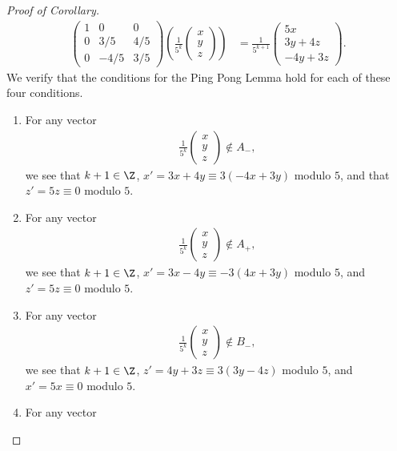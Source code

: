 \documentclass[10pt]{mypackage}
\begin{document}
\begin{proof}[Proof of Corollary]
\begin{align*}
    \begin{pmatrix}1 & 0 & 0 \\ 0 & 3/5 & 4/5 \\ 0 & -4/5 & 3/5\end{pmatrix} \left(\frac{1}{5^{k}} \begin{pmatrix}x\\y\\z\end{pmatrix}\right) &= \frac{1}{5^{k+1}} \begin{pmatrix}5x \\ 3y + 4z \\ -4y + 3z\end{pmatrix}.\tag*{(4)}
  \end{align*}
  We verify that the conditions for the Ping Pong Lemma hold for each of these four conditions.
  \begin{enumerate}[(1)]
    \item For any vector
      \begin{align*}
        \frac{1}{5^{k}} \begin{pmatrix}x\\y\\z\end{pmatrix} \notin A_{-},
      \end{align*}
      we see that $k+1\in \Z$, $x' = 3x + 4y \equiv 3\left(-4x + 3y\right)$  modulo $5$, and that $z' = 5z\equiv 0$ modulo $5$.
    \item For any vector
      \begin{align*}
        \frac{1}{5^{k}} \begin{pmatrix}x\\y\\z\end{pmatrix} \notin A_{+},
      \end{align*}
      we see that $k+1\in \Z$, $x' = 3x - 4y\equiv -3\left(4x + 3y\right)$ modulo $5$, and $z' = 5z \equiv 0$ modulo $5$.
    \item For any vector
      \begin{align*}
        \frac{1}{5^{k}} \begin{pmatrix}x\\y\\z\end{pmatrix}\notin B_{-},
      \end{align*}
      we see that $k+1\in \Z$, $z' = 4y + 3z \equiv 3\left(3y-4z\right)$ modulo $5$, and $x' = 5x\equiv 0$ modulo $5$.
    \item For any vector

\end{enumerate}
\end{proof}
\end{document}
